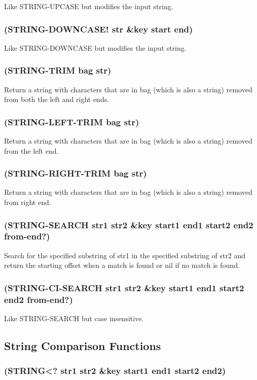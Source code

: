 \documentclass[11pt]{article}
\begin{document}
Like STRING-UPCASE but modifies the input string.
\subsubsection{(STRING-DOWNCASE! str \&key start end)}
\label{sec-4-28-11}

Like STRING-DOWNCASE but modifies the input string.
\subsubsection{(STRING-TRIM bag str)}
\label{sec-4-28-12}

Return a string with characters that are in bag (which is also a
string) removed from both the left and right ends.
\subsubsection{(STRING-LEFT-TRIM bag str)}
\label{sec-4-28-13}

Return a string with characters that are in bag (which is also a
string) removed from the left end.
\subsubsection{(STRING-RIGHT-TRIM bag str)}
\label{sec-4-28-14}

Return a string with characters that are in bag (which is also a
string) removed from right end.
\subsubsection{(STRING-SEARCH str1 str2 \&key start1 end1 start2 end2 from-end?)}
\label{sec-4-28-15}

Search for the specified substring of str1 in the specified substring
of str2 and return the starting offset when a match is found or nil
if no match is found.
\subsubsection{(STRING-CI-SEARCH str1 str2 \&key start1 end1 start2 end2 from-end?)}
\label{sec-4-28-16}

Like STRING-SEARCH but case insensitive.
\subsection{String Comparison Functions}
\label{sec-4-29}

\subsubsection{(STRING<? str1 str2 \&key start1 end1 start2 end2)}
\label{sec-4-29-1}
\end{document}
